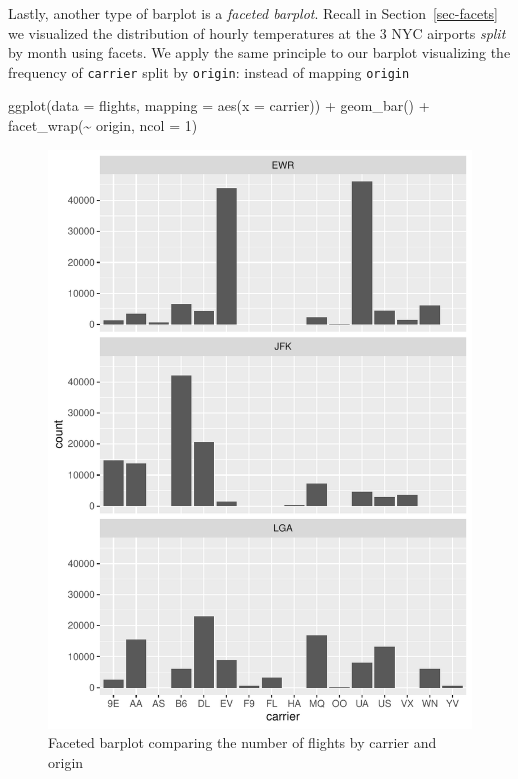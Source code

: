 \documentclass[
  letterpaper,
  DIV=11,
  numbers=noendperiod]{scrreprt}
\newenvironment{Shaded}{\begin{snugshade}}{\end{snugshade}}
\newcommand{\AttributeTok}[1]{\textcolor[rgb]{0.40,0.45,0.13}{#1}}
\newcommand{\DecValTok}[1]{\textcolor[rgb]{0.68,0.00,0.00}{#1}}
\newcommand{\FunctionTok}[1]{\textcolor[rgb]{0.28,0.35,0.67}{#1}}
\newcommand{\NormalTok}[1]{\textcolor[rgb]{0.00,0.23,0.31}{#1}}
\newcommand{\SpecialCharTok}[1]{\textcolor[rgb]{0.37,0.37,0.37}{#1}}
\theoremstyle{definition}
\theoremstyle{remark}
\begin{document}
Lastly, another type of barplot is a \emph{faceted barplot}. Recall in
Section~\ref{sec-facets} we visualized the distribution of hourly
temperatures at the 3 NYC airports \emph{split} by month using facets.
We apply the same principle to our barplot visualizing the frequency of
\texttt{carrier} split by \texttt{origin}: instead of mapping
\texttt{origin}

\begin{Shaded}
\begin{Highlighting}[]
\FunctionTok{ggplot}\NormalTok{(}\AttributeTok{data =}\NormalTok{ flights, }\AttributeTok{mapping =} \FunctionTok{aes}\NormalTok{(}\AttributeTok{x =}\NormalTok{ carrier)) }\SpecialCharTok{+}
  \FunctionTok{geom\_bar}\NormalTok{() }\SpecialCharTok{+}
  \FunctionTok{facet\_wrap}\NormalTok{(}\SpecialCharTok{\textasciitilde{}}\NormalTok{ origin, }\AttributeTok{ncol =} \DecValTok{1}\NormalTok{)}
\end{Highlighting}
\end{Shaded}

\begin{figure}[H]

{\centering \includegraphics{02-visualization_files/figure-pdf/fig-facet-bar-vert-1.pdf}

}

\caption{\label{fig-facet-bar-vert}Faceted barplot comparing the number
of flights by carrier and origin}

\end{figure}
\end{document}
